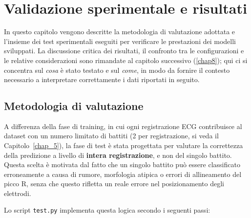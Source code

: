 \chapter{Validazione sperimentale e risultati}
\label{ch:validazione}

In questo capitolo vengono descritte la metodologia di valutazione adottata e l'insieme dei test sperimentali eseguiti per verificare le prestazioni dei modelli sviluppati. La discussione critica dei risultati, il confronto tra le configurazioni e le relative considerazioni sono rimandate al capitolo successivo (\ref{chap8}); qui ci si concentra sul \emph{cosa} è stato testato e sul \emph{come}, in modo da fornire il contesto necessario a interpretare correttamente i dati riportati in seguito.

\section{Metodologia di valutazione}
\label{sec:metodologia-valutazione}

A differenza della fase di training, in cui ogni registrazione ECG contribuisce al dataset con un numero limitato di battiti (2 per registrazione, si veda il Capitolo~\ref{chap_5}), la fase di test è stata progettata per valutare la correttezza della predizione a livello di \textbf{intera registrazione}, e non del singolo battito. Questa scelta è motivata dal fatto che un singolo battito può essere classificato erroneamente a causa di rumore, morfologia atipica o errori di allineamento del picco R, senza che questo rifletta un reale errore nel posizionamento degli elettrodi.

Lo script \texttt{test.py} implementa questa logica secondo i seguenti passi:

